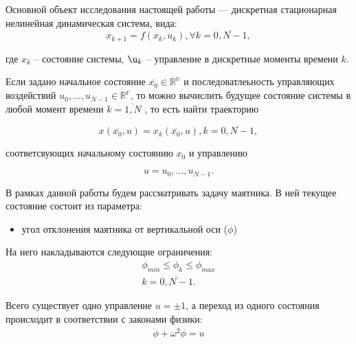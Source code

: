 Основной объект исследования настоящей работы — дискретная стационарная нелинейная динамическая система, вида:
\begin{equation}
	x_{k+1} = f(x_k, u_k), \forall k = \overline{0, N-1}, 
\end{equation}

где $x_k$ -- состояние системы, $\u_k$ -- управление в дискретные моменты времени $k$.

Если задано начальное состояние $\overline{x_0}\in \mathbb{R^n}$ и последоватлеьность управляющих воздействий $u_0, \dots , u_{N-1} \in \mathbb{R^r}$, то можно вычислить будущее состояние системы в любой момент времени $k=\overline{1, N}$ , то есть найти траекторию 

\begin{equation}
	x(\overline{x_0}, u) = {x_k(\overline{x_0}, u), k = \overline{0, N-1}},  
\end{equation}

соответсвующих начальному состоянию $x_0$ и управлению 

\begin{equation}
	u = {u_0, \dots, u_{N-1}}.
\end{equation}

В рамках данной работы будем рассматривать задачу маятника. В ней текущее состояние состоит из параметра:

\begin{itemize}
	\item угол отклонения маятника от вертикальной оси ($\phi$)
\end{itemize}

На него накладываются следующие ограничения:
\begin{equation}
	\begin{aligned}
		\phi_{min} \leq \phi_k \leq \phi_{max} \\
		k = \overline{0, N-1}.
	\end{aligned}
\end{equation}

Всего существует одно  управление $u = \pm 1$, а переход из одного состояния происходит в соответствии с законами физики:
\begin{equation}
	\begin{aligned}
		\ddot{\phi} + \omega^2 \phi = u 
	\end{aligned}
\end{equation}


